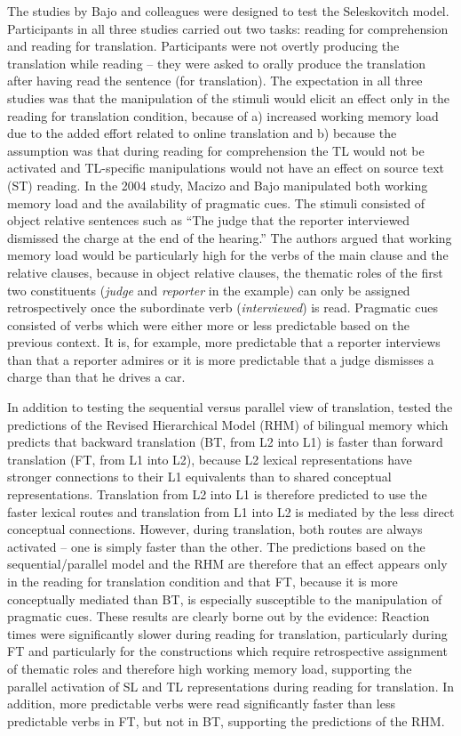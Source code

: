 \documentclass[output=paper]{LSP/langsci}
\begin{document}
The studies by Bajo and colleagues were designed to test the Seleskovitch model. Participants in all three studies carried out two tasks: reading for comprehension and reading for translation. Participants were not overtly producing the translation while reading --
\largerpage
they were asked to orally produce the translation after having read the sentence (for translation). The expectation in all three studies was that the manipulation of the stimuli would elicit an effect only in the reading for translation condition, because of a) increased working memory load due to the added effort related to online translation and b) because the assumption was that during reading for comprehension the TL would not be activated and TL-specific manipulations would not have an effect on source text (ST) reading. In the 2004 study, Macizo and Bajo manipulated both working memory load and the availability of pragmatic cues. The stimuli consisted of object relative sentences such as ``The judge that the reporter interviewed dismissed the charge at the end of the hearing.'' The authors argued that working memory load would be particularly high for the verbs of the main clause and the relative clauses, because in object relative clauses, the thematic roles of the first two constituents (\textit{judge} and \textit{reporter} in the example) can only be assigned retrospectively once the subordinate verb (\textit{interviewed}) is read. Pragmatic cues consisted of verbs which were either more or less predictable based on the previous context. It is, for example, more predictable that a reporter interviews than that a reporter admires or it is more predictable that a judge dismisses a charge than that he drives a car.

In addition to testing the sequential versus parallel view of translation, \citet{Macizo2004a} tested the predictions of the Revised Hierarchical Model (RHM) of bilingual memory \citep{Kroll1994} which predicts that backward translation (BT, from L2 into L1) is faster than forward translation (FT, from L1 into L2), because L2 lexical representations have stronger connections to their L1 equivalents than to shared conceptual representations. Translation from L2 into L1 is therefore predicted to use the faster lexical routes and translation from L1 into L2 is mediated by the less direct conceptual connections. However, during translation, both routes are always activated -- one is simply faster than the other. The predictions based on the sequential/parallel model and the RHM are therefore that an effect appears only in the reading for translation condition and that FT, because it is more conceptually mediated than BT, is especially susceptible to the manipulation of pragmatic cues. These results are clearly borne out by the evidence: Reaction times were significantly slower during reading for translation, particularly during FT and particularly for the constructions which require retrospective assignment of thematic roles and therefore high working memory load, supporting the parallel activation of SL and TL representations during reading for translation. In addition, more predictable verbs were read significantly faster than less predictable verbs in FT, but not in BT, supporting the predictions of the RHM.
\end{document}
